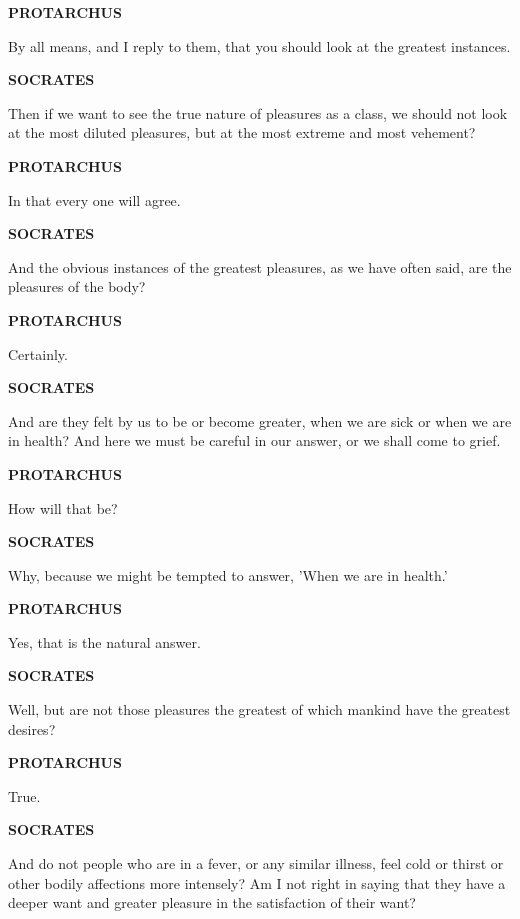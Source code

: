 \documentclass[11pt,letter]{article}
\begin{document}
\par \textbf{PROTARCHUS}
\par   By all means, and I reply to them, that you should look at the greatest instances.

\par \textbf{SOCRATES}
\par   Then if we want to see the true nature of pleasures as a class, we should not look at the most diluted pleasures, but at the most extreme and most vehement?

\par \textbf{PROTARCHUS}
\par   In that every one will agree.

\par \textbf{SOCRATES}
\par   And the obvious instances of the greatest pleasures, as we have often said, are the pleasures of the body?

\par \textbf{PROTARCHUS}
\par   Certainly.

\par \textbf{SOCRATES}
\par   And are they felt by us to be or become greater, when we are sick or when we are in health? And here we must be careful in our answer, or we shall come to grief.

\par \textbf{PROTARCHUS}
\par   How will that be?

\par \textbf{SOCRATES}
\par   Why, because we might be tempted to answer, 'When we are in health.'

\par \textbf{PROTARCHUS}
\par   Yes, that is the natural answer.

\par \textbf{SOCRATES}
\par   Well, but are not those pleasures the greatest of which mankind have the greatest desires?

\par \textbf{PROTARCHUS}
\par   True.

\par \textbf{SOCRATES}
\par   And do not people who are in a fever, or any similar illness, feel cold or thirst or other bodily affections more intensely? Am I not right in saying that they have a deeper want and greater pleasure in the satisfaction of their want?
\end{document}
